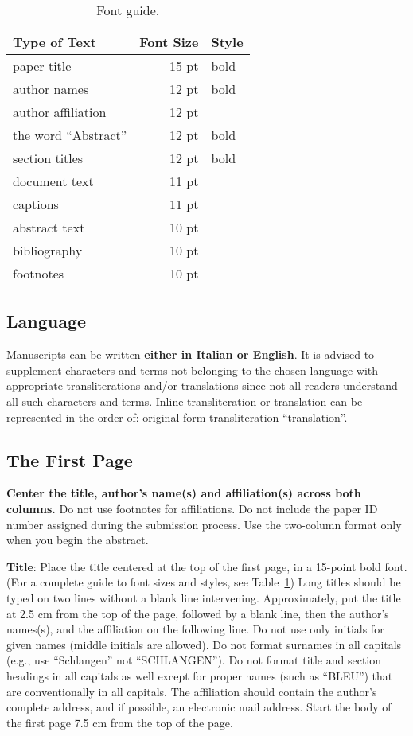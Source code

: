 \documentclass[11pt]{article}
\begin{document}
\begin{table}[h]
\begin{center}
\begin{tabular}{|l|rl|}
\hline \bf Type of Text & \bf Font Size & \bf Style \\ \hline
paper title & 15 pt & bold \\
author names & 12 pt & bold \\
author affiliation & 12 pt & \\
the word ``Abstract'' & 12 pt & bold \\
section titles & 12 pt & bold \\
document text & 11 pt  &\\
captions & 11 pt & \\
abstract text & 10 pt & \\
bibliography & 10 pt & \\
footnotes & 10 pt & \\
\hline
\end{tabular}
\end{center}
\caption{\label{font-table} Font guide. }
\end{table}

\subsection{Language}
\label{ssec:lang}
Manuscripts can be written {\bf either in Italian or English}. It is 
advised to supplement characters and terms not belonging to the
chosen language with appropriate transliterations and/or translations
since not all readers understand all such characters and terms.
Inline transliteration or translation can be represented in
the order of: original-form transliteration ``translation''.


\subsection{The First Page}
\label{ssec:first}

\textbf{Center the title, author's name(s) and affiliation(s) across both
columns.} Do not use footnotes for affiliations. Do not include the
paper ID number assigned during the submission process. Use the
two-column format only when you begin the abstract.

{\bf Title}: Place the title centered at the top of the first page, in
a 15-point bold font. (For a complete guide to font sizes and styles,
see Table~\ref{font-table}) Long titles should be typed on two lines
without a blank line intervening. Approximately, put the title at 2.5
cm from the top of the page, followed by a blank line, then the
author's names(s), and the affiliation on the following line. Do not
use only initials for given names (middle initials are allowed). Do
not format surnames in all capitals (e.g., use ``Schlangen'' not
``SCHLANGEN'').  Do not format title and section headings in all
capitals as well except for proper names (such as ``BLEU'') that are
conventionally in all capitals.  The affiliation should contain the
author's complete address, and if possible, an electronic mail
address. Start the body of the first page 7.5 cm from the top of the
page.
\end{document}
